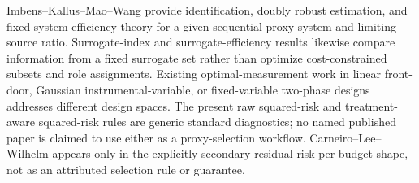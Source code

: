 Imbens--Kallus--Mao--Wang provide identification, doubly robust estimation, and fixed-system efficiency theory for a given sequential proxy system and limiting source ratio. Surrogate-index and surrogate-efficiency results likewise compare information from a fixed surrogate set rather than optimize cost-constrained subsets and role assignments. Existing optimal-measurement work in linear front-door, Gaussian instrumental-variable, or fixed-variable two-phase designs addresses different design spaces. The present raw squared-risk and treatment-aware squared-risk rules are generic standard diagnostics; no named published paper is claimed to use either as a proxy-selection workflow. Carneiro--Lee--Wilhelm appears only in the explicitly secondary residual-risk-per-budget shape, not as an attributed selection rule or guarantee.